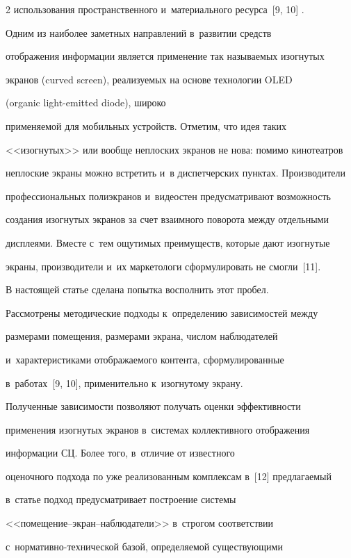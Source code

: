 \begin{multicols}{2}
использования пространственного и~материального ресурса~[9, 10] .



     Одним из наиболее заметных направлений в~развитии средств

отображения информации является применение так называемых изогнутых

экранов (curved screen), реализуемых на основе технологии OLED

(organic light-emitted diode), широко

применяемой для мобильных устройств. Отметим, что идея таких

<<изогнутых>> или вообще неплоских экранов не нова: помимо кинотеатров

неплоские экраны можно встретить и~в диспетчерских пунктах. Производители

профессиональных полиэкранов и~видеостен предусматривают возможность

создания изогнутых экранов за счет взаимного поворота между отдельными

дисплеями. Вместе с~тем ощутимых преимуществ, которые дают изогнутые

экраны, производители и~их маркетологи сформулировать не смогли~[11].



     В настоящей статье сделана попытка восполнить этот пробел.

Рассмотрены методические подходы к~определению зависимостей между

размерами помещения, разме\-рами экрана, числом наблюда\-телей

и~характеристиками отображаемого контента, сформулированные

в~работах~[9, 10], применительно к~изогнутому экрану.

Полученные зависимости позволяют получать оценки эффективности

применения изогнутых экранов в~сис\-те\-мах коллективного отображения

информации СЦ. Более того, в~отличие от известного

оценочного подхода по уже реализованным комплексам в~[12] предлагаемый

в~статье подход предусматривает \mbox{построение} сис\-те\-мы

     <<по\-ме\-ще\-ние--экран--наблю\-да\-те\-ли>> в~строгом соответствии

с~нор\-ма\-тив\-но-тех\-ни\-че\-ской базой, определяемой существующими


\end{multicols}
